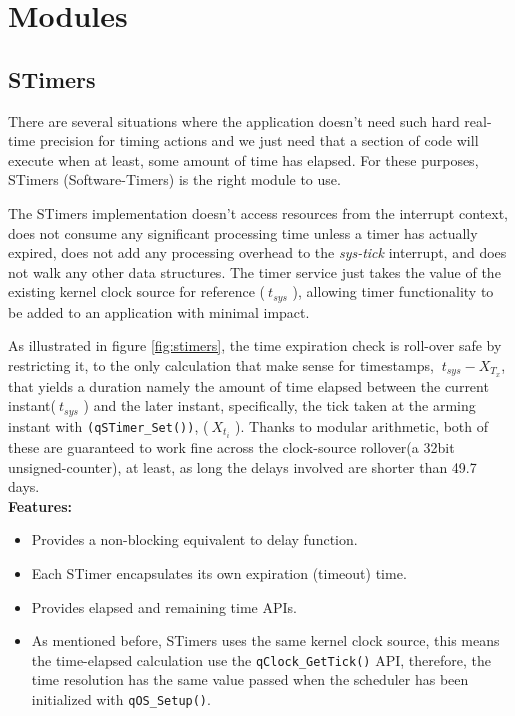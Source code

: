 \documentclass{article}
\begin{document}
\newpage

\section{Modules}

\subsection{STimers}
There are several situations where the application doesn't need such hard real-time precision for timing actions and we just need that a section of code will execute when at least, some amount of time has elapsed. For these purposes, STimers (Software-Timers) is the right module to use. 

The STimers implementation doesn't access resources from the interrupt context, does not consume any significant processing time unless a timer has actually expired, does not add any processing overhead to the \textit{sys-tick} interrupt, and does not walk any other data structures. The timer service just takes the value of the existing kernel clock source for reference ($\ t_{sys}$ ), allowing timer functionality to be added to an application with minimal impact.



As illustrated in figure \ref{fig:stimers}, the time expiration check is roll-over safe by restricting it, to the only calculation that make sense for timestamps, $\ t_{sys} - X_{T_x}$, that yields a duration namely the amount of time elapsed between the current instant($\ t_{sys}$ ) and the later instant, specifically, the tick taken at the arming instant with \lstinline{(qSTimer_Set())}, ($\ X_{t_i}$ ).
Thanks to modular arithmetic, both of these are guaranteed to work fine across the clock-source rollover(a 32bit unsigned-counter), at least, as long the delays involved are shorter than 49.7 days. \\

\textbf{Features:}
\begin{itemize}
    \item Provides a non-blocking equivalent to delay function.
    \item Each STimer encapsulates its own expiration (timeout) time.
    \item Provides elapsed and remaining time APIs.
    \item As mentioned before, STimers uses the same kernel clock source, this means the time-elapsed calculation use the \lstinline{qClock_GetTick()} API, therefore, the time resolution has the same value passed when the scheduler has been initialized with \lstinline{qOS_Setup()}.
\end{itemize}
\end{document}
